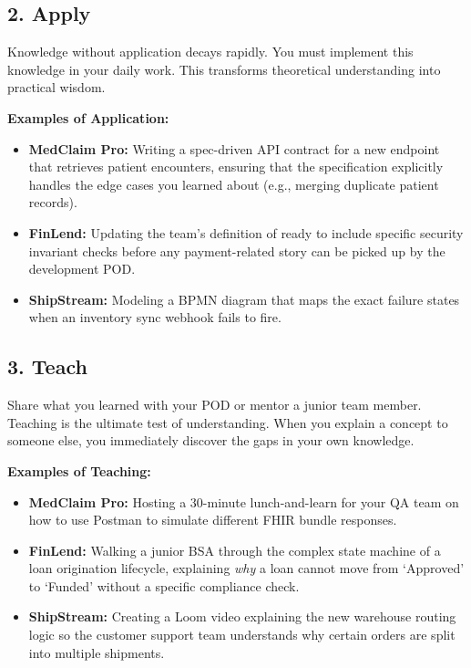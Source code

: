 \documentclass[
  11pt,
  openany,
  oneside]{book}
\providecommand{\tightlist}{%
  \setlength{\itemsep}{0pt}\setlength{\parskip}{0pt}}
\begin{document}
\subsection{2. Apply}\label{apply}

Knowledge without application decays rapidly. You must implement this
knowledge in your daily work. This transforms theoretical understanding
into practical wisdom.

\textbf{Examples of Application:}

\begin{itemize}
\tightlist
\item
  \textbf{MedClaim Pro:} Writing a spec-driven API contract for a new
  endpoint that retrieves patient encounters, ensuring that the
  specification explicitly handles the edge cases you learned about
  (e.g., merging duplicate patient records).
\item
  \textbf{FinLend:} Updating the team's definition of ready to include
  specific security invariant checks before any payment-related story
  can be picked up by the development POD.
\item
  \textbf{ShipStream:} Modeling a BPMN diagram that maps the exact
  failure states when an inventory sync webhook fails to fire.
\end{itemize}

\subsection{3. Teach}\label{teach}

Share what you learned with your POD or mentor a junior team member.
Teaching is the ultimate test of understanding. When you explain a
concept to someone else, you immediately discover the gaps in your own
knowledge.

\textbf{Examples of Teaching:}

\begin{itemize}
\tightlist
\item
  \textbf{MedClaim Pro:} Hosting a 30-minute lunch-and-learn for your QA
  team on how to use Postman to simulate different FHIR bundle
  responses.
\item
  \textbf{FinLend:} Walking a junior BSA through the complex state
  machine of a loan origination lifecycle, explaining \emph{why} a loan
  cannot move from `Approved' to `Funded' without a specific compliance
  check.
\item
  \textbf{ShipStream:} Creating a Loom video explaining the new
  warehouse routing logic so the customer support team understands why
  certain orders are split into multiple shipments.
\end{itemize}
\end{document}
